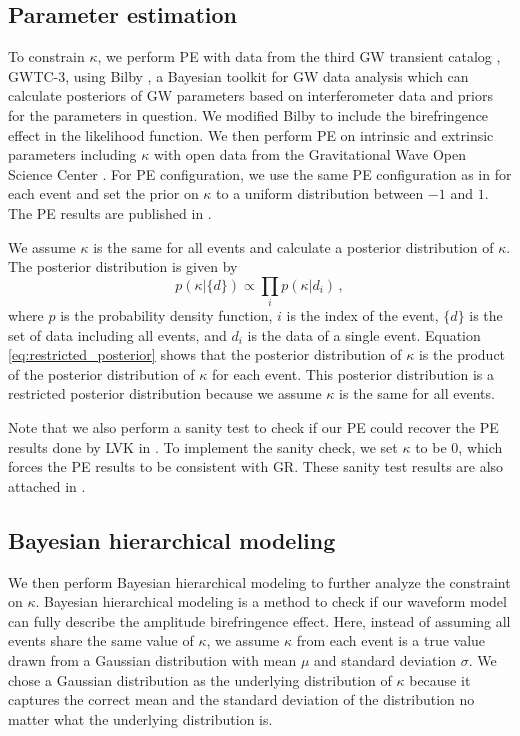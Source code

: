 \documentclass[aps,prd,twocolumn,superscriptaddress,preprintnumbers,floatfix,nofootinbib]{revtex4-2}
\begin{document}
\subsection{Parameter estimation}
To constrain $\kappa$, we perform PE with data from the third GW transient catalog \citep{GWTC-2.1, GWTC-3}, GWTC-3, using Bilby \citep{Bilby}, a Bayesian toolkit for GW data analysis which can calculate posteriors of GW parameters based on interferometer data and priors for the parameters in question.
We modified Bilby to include the birefringence effect in the likelihood function.
We then perform PE on intrinsic and extrinsic parameters including $\kappa$ with open data from the Gravitational Wave Open Science Center \citep{GWOSC}.
For PE configuration, we use the same PE configuration as in \citet{GWTC-2.1, GWTC-3, GWTC-2.1_dataset, GWTC-3_dataset} for each event and set the prior on $\kappa$ to a uniform distribution between $-1$ and $1$.
The PE results are published in \citet{dataset}.

We assume $\kappa$ is the same for all events and calculate a posterior distribution of $\kappa$.
The posterior distribution is given by
\begin{equation}
    p(\kappa|\{d\})\propto \prod_{i}p(\kappa|d_i)\,,
    \label{eq:restricted_posterior}
\end{equation}
where $p$ is the probability density function, $i$ is the index of the event, $\{d\}$ is the set of data including all events, and $d_i$ is the data of a single event.
Equation \ref{eq:restricted_posterior} shows that the posterior distribution of $\kappa$ is the product of the posterior distribution of $\kappa$ for each event.
This posterior distribution is a restricted posterior distribution because we assume $\kappa$ is the same for all events.

Note that we also perform a sanity test to check if our PE could recover the PE results done by LVK in \citet{GWTC-2.1, GWTC-3}.
To implement the sanity check, we set $\kappa$ to be $0$, which forces the PE results to be consistent with GR.
These sanity test results are also attached in \citet{dataset}.

\subsection{Bayesian hierarchical modeling}
We then perform Bayesian hierarchical modeling to further analyze the constraint on $\kappa$.
Bayesian hierarchical modeling is a method to check if our waveform model can fully describe the amplitude birefringence effect.
Here, instead of assuming all events share the same value of $\kappa$, we assume $\kappa$ from each event is a true value drawn from a Gaussian distribution with mean $\mu$ and standard deviation $\sigma$.
We chose a Gaussian distribution as the underlying distribution of $\kappa$ because it captures the correct mean and the standard deviation of the distribution no matter what the underlying distribution is.
\end{document}
